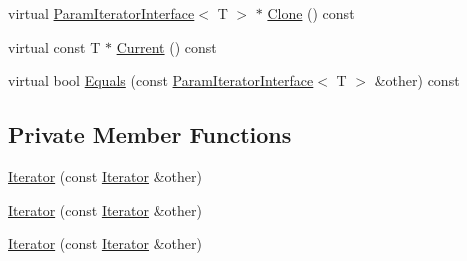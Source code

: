 \begin{DoxyCompactItemize}
\item 
virtual \mbox{\hyperlink{classtesting_1_1internal_1_1_param_iterator_interface}{Param\+Iterator\+Interface}}$<$ T $>$ $\ast$ \mbox{\hyperlink{classtesting_1_1internal_1_1_values_in_iterator_range_generator_1_1_iterator_a61476fb91ef8307b8f3b9c48832a307c}{Clone}} () const
\item 
virtual const T $\ast$ \mbox{\hyperlink{classtesting_1_1internal_1_1_values_in_iterator_range_generator_1_1_iterator_a37b25780b27c16195042003eaa1a286a}{Current}} () const
\item 
virtual bool \mbox{\hyperlink{classtesting_1_1internal_1_1_values_in_iterator_range_generator_1_1_iterator_aff9f8c1c01a4e708235d8793b2c44d31}{Equals}} (const \mbox{\hyperlink{classtesting_1_1internal_1_1_param_iterator_interface}{Param\+Iterator\+Interface}}$<$ T $>$ \&other) const
\end{DoxyCompactItemize}
\subsection*{Private Member Functions}
\begin{DoxyCompactItemize}
\item 
\mbox{\hyperlink{classtesting_1_1internal_1_1_values_in_iterator_range_generator_1_1_iterator_a87cadeed020bb8bfbdce636fca31b9ef}{Iterator}} (const \mbox{\hyperlink{classtesting_1_1internal_1_1_values_in_iterator_range_generator_1_1_iterator}{Iterator}} \&other)
\item 
\mbox{\hyperlink{classtesting_1_1internal_1_1_values_in_iterator_range_generator_1_1_iterator_a87cadeed020bb8bfbdce636fca31b9ef}{Iterator}} (const \mbox{\hyperlink{classtesting_1_1internal_1_1_values_in_iterator_range_generator_1_1_iterator}{Iterator}} \&other)
\item 
\mbox{\hyperlink{classtesting_1_1internal_1_1_values_in_iterator_range_generator_1_1_iterator_a87cadeed020bb8bfbdce636fca31b9ef}{Iterator}} (const \mbox{\hyperlink{classtesting_1_1internal_1_1_values_in_iterator_range_generator_1_1_iterator}{Iterator}} \&other)
\end{DoxyCompactItemize}
